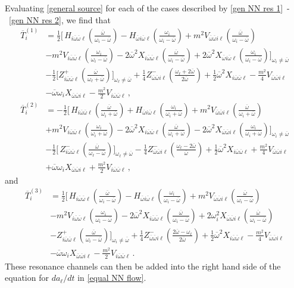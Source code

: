 \documentclass[letterpaper,11pt]{article}
\newcommand{\oi}{\omega_i}
\newcommand{\ol}{\omega_\ell}
\newcommand{\ob}{\overline{\omega}}
\begin{document}
Evaluating \eqref{general source} for each of the cases described by \eqref{gen NN res 1}~\!-~\!\eqref{gen NN res 2}, we find that
\begin{align}
\overline{T}^{(1)}_{i} &= \frac{1}{2} \bigg[ \, H_{i\ob\ob\ell} \left( \frac{\ob}{\oi - \ob} \right) - H_{\ob i \ob\ell} \left( \frac{\oi}{\oi - \ob} \right) + m^2 V_{\ob\ob i\ell} \left( \frac{\ob}{\oi - \ob} \right) \nonumber \\
%
& - m^2 V_{i \ob\ob\ell} \left( \frac{\oi}{\oi - \ob} \right) - 2 \ob^2 X_{i\ob\ob\ell} \left( \frac{\ob}{\oi - \ob} \right) + 2 \ob^2 X_{\ob i \ob\ell} \left( \frac{\oi}{\oi - \ob} \right) \bigg]_{\oi \neq \ob} \nonumber \\
%
& -\frac{1}{2} \bigg[ Z^+_{i\ob\ob\ell} \left( \frac{\ob}{\ol + \ob} \right) \bigg]_{\ol \neq \ob} \!\! + \frac{1}{4} Z^-_{\ob\ob i \ell} \left( \frac{\ol + 2\ob}{2 \ob} \right) + \frac{1}{2} \ob^2 X_{i\ob\ob\ell} - \frac{m^2}{4} V_{\ob\ob i \ell} \nonumber \\
%
& - \ob \oi X_{\ob\ob i\ell} - \frac{m^2}{2} V_{i \ob\ob\ell} \, ,
\end{align}
\begin{align}
\overline{T}^{(2)}_{i} &=  - \frac{1}{2} \bigg[ \, H_{i\ob\ob \ell} \left( \frac{\ob}{\oi + \ob} \right) + H_{\ob i \ob \ell} \left( \frac{\oi}{\oi + \ob} \right) + m^2 V_{\ob \ob i \ell} \left( \frac{\ob}{\oi + \ob} \right) \nonumber \\
%
& + m^2 V_{i\ob\ob\ell} \left( \frac{\oi}{\oi + \ob} \right) - 2 \ob^2 X_{i \ob\ob\ell} \left( \frac{\ob}{\oi + \ob} \right) - 2 \ob^2 X_{\ob\ob i\ell} \left( \frac{\oi}{\oi + \ob} \right) \bigg]_{\oi \neq \ob} \nonumber \\
%
& - \frac{1}{2} \bigg[ \, Z^{-}_{i \ob \ob \ell} \left( \frac{\ob}{\ol - \ob} \right) \bigg]_{\ol \neq \ob} \!\!\!\! - \frac{1}{4} Z^-_{\ob\ob i \ell} \left( \frac{\ol - 2\ob}{\ob} \right) + \frac{1}{2} \ob^2 X_{i\ob\ob\ell} + \frac{m^2}{4} V_{\ob\ob i\ell} \nonumber \\
%
& + \ob \oi X_{\ob\ob i \ell} + \frac{m^2}{2} V_{i \ob\ob \ell} \, ,
\end{align}
and
\begin{align}
\overline{T}^{(3)}_{i} &= \frac{1}{2} \bigg[ \, H_{i\ob\ob\ell} \left( \frac{\ob}{\oi - \ob} \right) - H_{\ob i \ob\ell} \left( \frac{\oi}{\oi - \ob} \right) + m^2 V_{\ob\ob i \ell} \left( \frac{\ob}{\oi - \ob} \right) \nonumber \\
%
& - m^2 V_{i\ob\ob\ell} \left( \frac{\oi}{\oi - \ob} \right) - 2 \ob^2 X_{i\ob\ob\ell} \left( \frac{\ob}{\oi-\ob} \right) + 2 \oi^2 X_{\ob\ob i\ell} \left( \frac{\ob}{\oi-\ob} \right) \nonumber \\
%
& - Z^+_{i\ob\ob\ell} \left( \frac{\ob}{\oi - \ob} \right) \bigg]_{\oi \neq \ob} + \frac{1}{4} Z^-_{\ob\ob i \ell} \left( \frac{2\ob - \ol}{2\ob} \right) + \frac{1}{2} \ob^2 X_{i\ob\ob\ell} - \frac{m^2}{4} V_{\ob\ob i\ell} \nonumber \\
%
&  - \ob \oi X_{\ob\ob i\ell} - \frac{m^2}{2} V_{i\ob\ob\ell} \, .
\end{align}
These resonance channels can then be added into the right hand side of the equation for $d a_\ell / d t$ in \eqref{equal NN flow}.
\end{document}

